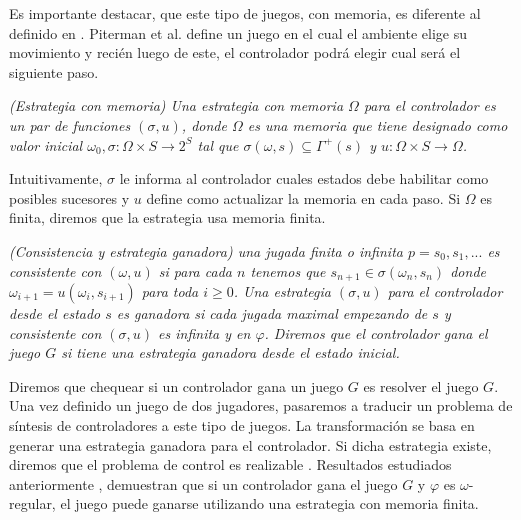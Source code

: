 Es importante destacar, que este tipo de juegos, con memoria, es diferente al definido en \cite{Piterman}. Piterman et al.
define un juego en el cual el ambiente elige su movimiento y recién luego de este, el controlador podrá elegir cual será
el siguiente paso.

\begin{nahaDef}
    \emph{(Estrategia con memoria) Una estrategia con memoria $\Omega$ para el controlador es un par de funciones
    $(\sigma, u)$, donde $\Omega$ es una memoria que tiene designado como valor inicial $\omega_0, \sigma: \Omega \times
    S \rightarrow 2^S$ tal que $\sigma(\omega,s) \subseteq \Gamma^+(s)$ y $u: \Omega \times S \rightarrow \Omega$.}
\end{nahaDef}

Intuitivamente, $\sigma$ le informa al controlador cuales estados debe habilitar como posibles sucesores y $u$ define
como actualizar la memoria en cada paso. Si $\Omega$ es finita, diremos que la estrategia usa memoria finita.

\begin{nahaDef}
    \emph{(Consistencia y estrategia ganadora) una jugada finita o infinita $p = s_0,s_1,...$ es consistente con
    $(\omega,u)$ si para cada $n$ tenemos que $s_{n+1} \in \sigma(\omega_n,s_n)$ donde $\omega_{i+1} = u(\omega_i,s_{i+1})$ 
    para toda $i \geq 0$. Una estrategia $(\sigma, u)$ para el controlador desde el estado $s$ es
    ganadora si cada jugada maximal empezando de $s$ y consistente con $(\sigma, u)$ es infinita y en $\varphi$. Diremos
    que el controlador gana el juego $G$ si tiene una estrategia ganadora desde el estado inicial.}
\end{nahaDef}

Diremos que chequear si un controlador gana un juego $G$ es resolver el juego $G$. Una vez definido un juego de dos
jugadores, pasaremos a traducir un problema de síntesis de controladores a este tipo de juegos. La transformación se
basa en generar una estrategia ganadora para el controlador. Si dicha estrategia existe, diremos que el problema de
control es realizable \cite{MalerPS95,21072}. Resultados estudiados anteriormente \cite{Pnueli:1989:SRM:75277.75293},
demuestran que si un controlador gana el juego $G$ y $\varphi$ es $\omega$-regular, el juego puede ganarse utilizando
una estrategia con memoria finita.
